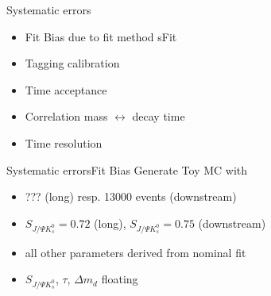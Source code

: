 \documentclass{beamer}
\newcommand{\SJPsi}{S_{J/\Psi K_s^0}}
\begin{document}
	
	\begin{frame}{Systematic errors}
	\begin{itemize}
		\item Fit Bias due to fit method sFit
	    \item Tagging calibration
	    \item Time acceptance
	    \item Correlation mass $\leftrightarrow$ decay time
	    \item Time resolution
	\end{itemize}
	\end{frame}
	
	\begin{frame}{Systematic errors}{Fit Bias}
	Generate Toy MC with 
	\begin{itemize}
	\item ??? (long) resp. 13000 events (downstream)
	\item $\SJPsi = 0.72$ (long), $\SJPsi = 0.75$ (downstream)
	\item all other parameters derived from nominal fit
	\item $\SJPsi$, $\tau$, $\Delta m_d$ floating
	\end{itemize}
    \end{frame}	
	
\end{document}
